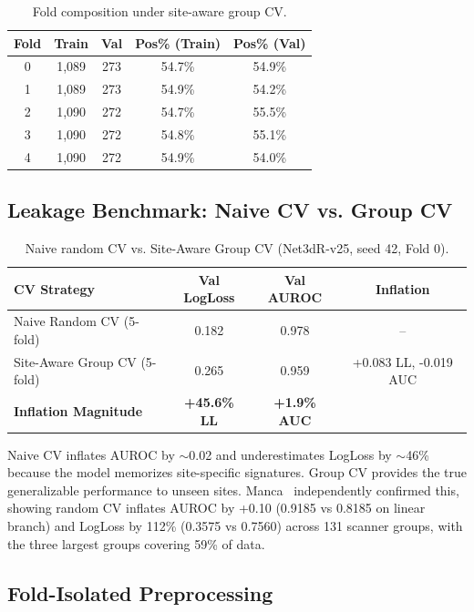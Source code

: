 \begin{table}[H]
\centering
\caption{Fold composition under site-aware group CV.}
\label{tab:fold_composition}
\begin{tabular}{ccccc}
\toprule
\textbf{Fold} & \textbf{Train} & \textbf{Val} & \textbf{Pos\% (Train)} & \textbf{Pos\% (Val)} \\
\midrule
0 & 1,089 & 273 & 54.7\% & 54.9\% \\
1 & 1,089 & 273 & 54.9\% & 54.2\% \\
2 & 1,090 & 272 & 54.7\% & 55.5\% \\
3 & 1,090 & 272 & 54.8\% & 55.1\% \\
4 & 1,090 & 272 & 54.9\% & 54.0\% \\
\bottomrule
\end{tabular}
\end{table}

\subsection{Leakage Benchmark: Naive CV vs. Group CV}
\label{sec:leakage_benchmark}

\begin{table}[H]
\centering
\caption{Naive random CV vs. Site-Aware Group CV (Net3dR-v25, seed 42, Fold 0).}
\label{tab:leakage_benchmark}
\begin{tabular}{lccc}
\toprule
\textbf{CV Strategy} & \textbf{Val LogLoss} & \textbf{Val AUROC} & \textbf{Inflation} \\
\midrule
Naive Random CV (5-fold) & 0.182 & 0.978 & -- \\
Site-Aware Group CV (5-fold) & 0.265 & 0.959 & +0.083 LL, -0.019 AUC \\
\midrule
\textbf{Inflation Magnitude} & \textbf{+45.6\% LL} & \textbf{+1.9\% AUC} & \\
\bottomrule
\end{tabular}
\end{table}

Naive CV inflates AUROC by $\sim$0.02 and underestimates LogLoss by $\sim$46\% because the model memorizes site-specific signatures. Group CV provides the true generalizable performance to unseen sites. Manca~\cite{manca2024dat} independently confirmed this, showing random CV inflates AUROC by +0.10 (0.9185 vs 0.8185 on linear branch) and LogLoss by 112\% (0.3575 vs 0.7560) across 131 scanner groups, with the three largest groups covering 59\% of data.

\subsection{Fold-Isolated Preprocessing}
\label{sec:fold_isolated}

